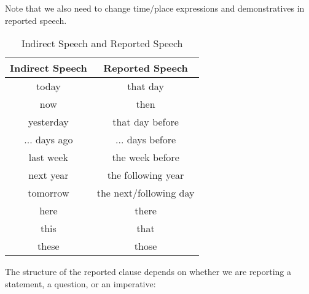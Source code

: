\documentclass[hidelinks,10pt,a4paper]{article}
\begin{document}
Note that we also need to change time/place expressions and demonstratives in reported speech.

\begin{table}[h!]
\begin{center}
\begin{tabular}{|c|c|}
	\hline
	\textbf{Indirect Speech} & \textbf{Reported Speech} \\ \hline
	today & that day \\ \hline
	now & then \\ \hline
	yesterday & that day before \\ \hline
	... days ago & ... days before \\ \hline
	last week & the week before \\ \hline
	next year & the following year \\ \hline
	tomorrow & the next/following day \\ \hline
	here & there \\ \hline
	this & that \\ \hline
	these & those \\ \hline
\end{tabular}
\end{center}
\caption{Indirect Speech and Reported Speech} \label{tab:isrs}
\end{table}

The structure of the reported clause depends on whether we are reporting a statement, a question, or an imperative:
\end{document}
